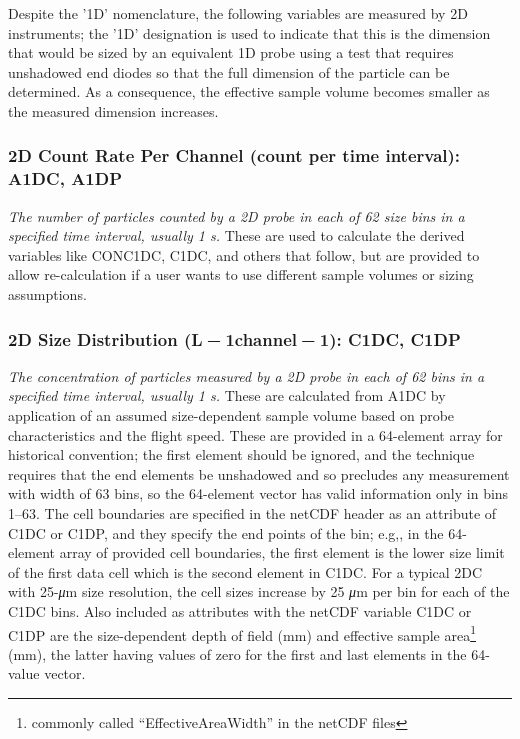 \documentclass[
  english,
]{book}
\begin{document}
\protect\hypertarget{Despite-the-ux271Dux27}{}{}Despite the '1D'
nomenclature, the following variables are measured by 2D instruments;
the '1D' designation is used to indicate that this is the dimension that
would be sized by an equivalent 1D probe using a test that requires
unshadowed end diodes so that the full dimension of the particle can be
determined. As a consequence, the effective sample volume becomes
smaller as the measured dimension increases.

\hypertarget{a1dc-a1dp}{%
\subsubsection*{2D Count Rate Per Channel (count per time interval):
A1DC, A1DP}\label{a1dc-a1dp}}

\emph{The number of particles counted by a 2D probe in each of 62 size
bins in a specified time interval, usually 1 s.} These are used to
calculate the derived variables like CONC1DC, C1DC, and others that
follow, but are provided to allow re-calculation if a user wants to use
different sample volumes or sizing assumptions.

\hypertarget{c1dc-c1dp}{%
\subsubsection*{\texorpdfstring{2D Size Distribution
(L{ − 1}channel{ − 1}): C1DC,
C1DP}{2D Size Distribution (L − 1channel − 1): C1DC, C1DP}}\label{c1dc-c1dp}}

\emph{The concentration of particles measured by a 2D probe in each of
62 bins in a specified time interval, usually 1 s.} These are calculated
from A1DC by application of an assumed size-dependent sample volume
based on probe characteristics and the flight speed. These are provided
in a 64-element array for historical convention; the first element
should be ignored, and the technique requires that the end elements be
unshadowed and so precludes any measurement with width of 63 bins, so
the 64-element vector has valid information only in bins 1--63. The cell
boundaries are specified in the netCDF header as an attribute of C1DC or
C1DP, and they specify the end points of the bin; e.g,, in the
64-element array of provided cell boundaries, the first element is the
lower size limit of the first data cell which is the second element in
C1DC. For a typical 2DC with 25-{\emph{μ}}m size resolution, the cell
sizes increase by 25 {\emph{μ}}m per bin for each of the C1DC bins. Also
included as attributes with the netCDF variable C1DC or C1DP are the
size-dependent depth of field (mm) and effective sample area\footnote{commonly
  called ``EffectiveAreaWidth'' in the netCDF files} (mm), the latter
having values of zero for the first and last elements in the 64-value
vector.
\end{document}
